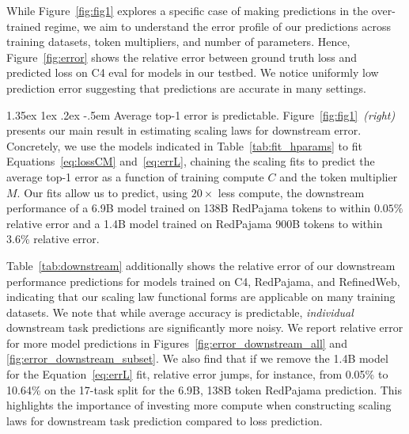 \documentclass[dvipsnames,11pt]{article}
\makeatletter
\renewcommand\paragraph{\@startsection{paragraph}{4}{\z@}                                     {1.35ex \@plus1ex \@minus.2ex}                                {-.5em}
{\normalfont\normalsize\bfseries}}
\makeatother
\begin{document}
While Figure~\ref{fig:fig1} explores a specific case of making predictions in the over-trained regime, we aim to understand the error profile of our predictions across training datasets, token multipliers, and number of parameters.
Hence, Figure~\ref{fig:error} shows the relative error between ground truth loss and predicted loss on C4 eval for models in our testbed.
We notice uniformly low prediction error suggesting that predictions are accurate in many settings.

\paragraph{Average top-1 error is predictable.}
Figure~\ref{fig:fig1}~\emph{(right)} presents our main result in estimating scaling laws for downstream error.
Concretely, we use the models indicated in Table~\ref{tab:fit_hparams} to fit Equations~\eqref{eq:lossCM} and~\eqref{eq:errL}, chaining the scaling fits to predict the average top-1 error as a function of training compute $C$ and the token multiplier $M$.
Our fits allow us to predict, using $20\times$ less compute, the downstream performance of a 6.9B model trained on 138B RedPajama tokens to within $0.05\%$ relative error and a 1.4B model trained on RedPajama 900B tokens to within $3.6\%$ relative error.

Table~\ref{tab:downstream} additionally shows the relative error of our downstream performance predictions for models trained on C4, RedPajama, and RefinedWeb, indicating that our scaling law functional forms are applicable on many training datasets.
We note that while average accuracy is predictable, \textit{individual} downstream task predictions are significantly more noisy.
We report relative error for more model predictions in Figures~\ref{fig:error_downstream_all} and \ref{fig:error_downstream_subset}.
We also find that if we remove the 1.4B model for the Equation~\eqref{eq:errL} fit, relative error jumps, for instance, from 0.05\% to 10.64\% on the 17-task split for the 6.9B, 138B token RedPajama prediction.
This highlights the importance of investing more compute when constructing scaling laws for downstream task prediction compared to loss prediction.
\end{document}
